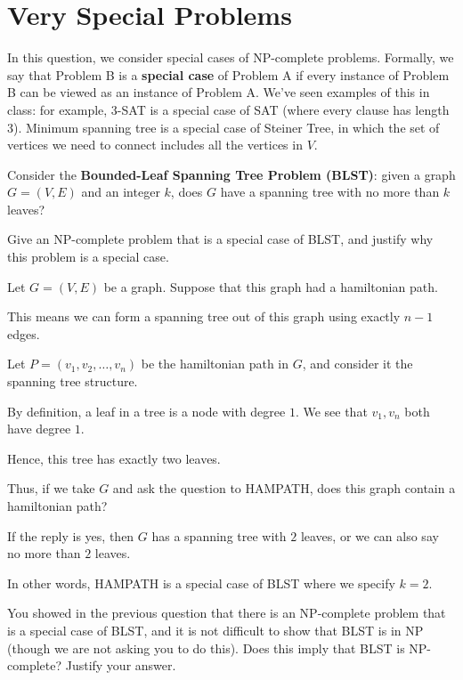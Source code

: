 \section{Very Special Problems}

In this question, we consider special cases of NP-complete problems. Formally, we say that Problem B is a \textbf{special case} of Problem A if every instance of Problem B can be viewed as an instance of Problem A. We've seen examples of this in class: for example, 3-SAT is a special case of SAT (where every clause has length 3). Minimum spanning tree is a special case of Steiner Tree, in which the set of vertices we need to connect includes all the vertices in $V$.

\begin{questions}

	\question[4] Consider the \textbf{Bounded-Leaf Spanning Tree Problem (BLST)}: given a graph $G = (V,E)$ and an integer $k$, does $G$ have a spanning tree with no more than $k$ leaves?

	Give an NP-complete problem that is a special case of BLST, and justify why this problem is a special case.

	\ifsolutions\fi

	\begin{soln}
		Let \(G = (V, E)\) be a graph. Suppose that this graph had a hamiltonian path.

		This means we can form a spanning tree out of this graph using exactly \(n - 1\) edges.

		Let \(P = (v_1, v_2, \dots, v_n)\) be the hamiltonian path in \(G\), and consider it the spanning tree structure.

		By definition, a leaf in a tree is a node with degree \(1\). We see that \(v_1, v_n\) both have degree \(1\).

		Hence, this tree has exactly two leaves.

		Thus, if we take \(G\) and ask the question to HAMPATH, does this graph contain a hamiltonian path?

		If the reply is yes, then \(G\) has a spanning tree with \(2\) leaves, or we can also say no more than \(2\) leaves.

		In other words, HAMPATH is a special case of BLST where we specify \(k = 2\).

	\end{soln}

	\question[3] You showed in the previous question that there is an NP-complete problem that is a special case of BLST, and it is not difficult to show that BLST is in NP (though we are not asking you to do this). Does this imply that BLST is NP-complete? Justify your answer.


\end{questions}
